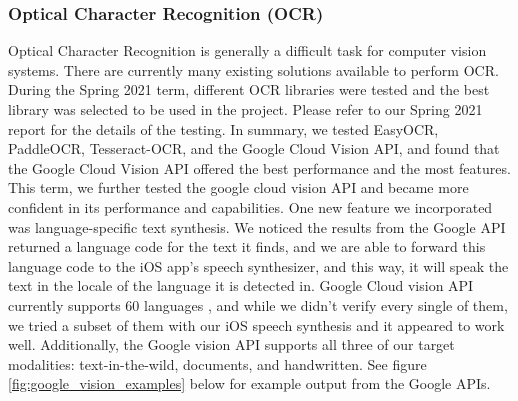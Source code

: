 \documentclass[a4paper,11pt]{article}
\begin{document}
\subsubsection{Optical Character Recognition (OCR)}
Optical Character Recognition is generally a difficult task for computer vision systems. There are currently many existing solutions available to perform OCR. During the Spring 2021 term, different OCR libraries were tested and the best library was selected to be used in the project. Please refer to our Spring 2021 report for the details of the testing. In summary, we tested EasyOCR, PaddleOCR, Tesseract-OCR, and the Google Cloud Vision API, and found that the Google Cloud Vision API offered the best performance and the most features. This term, we further tested the google cloud vision API and became more confident in its performance and capabilities. One new feature we incorporated was language-specific text synthesis. We noticed the results from the Google API returned a language code for the text it finds, and we are able to forward this language code to the iOS app's speech synthesizer, and this way, it will speak the text in the locale of the language it is detected in. Google Cloud vision API currently supports 60 languages \cite{google-languages}, and while we didn't verify every single of them, we tried a subset of them with our iOS speech synthesis and it appeared to work well. Additionally, the Google vision API supports all three of our target modalities: text-in-the-wild, documents, and handwritten. See figure \ref{fig:google_vision_examples} below for example output from the Google APIs.
\end{document}
